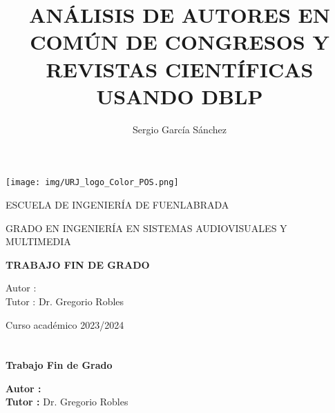 \documentclass[a4paper, 12pt]{book}
\title{ANÁLISIS DE AUTORES EN COMÚN DE CONGRESOS Y REVISTAS CIENTÍFICAS USANDO DBLP}
\author{Sergio García Sánchez}
\makeatletter
\let\thetitle\@title
\let\theauthor\@author
\makeatother
\begin{document}
\renewcommand{\refname}{Bibliografía}  %
\renewcommand{\appendixname}{Apéndice}



\begin{titlepage}
\begin{center}
\texttt{[image: img/URJ\_logo\_Color\_POS.png]}

\vspace{1.75cm}

\LARGE
ESCUELA DE INGENIERÍA DE FUENLABRADA
\vspace{1cm}

\LARGE
GRADO EN INGENIERÍA EN SISTEMAS AUDIOVISUALES Y MULTIMEDIA

\vspace{1cm}
\LARGE
\textbf{TRABAJO FIN DE GRADO}

\vspace{2cm}

\Large
\MakeUppercase{\thetitle}

\vspace{2cm}

\large
Autor : \theauthor \\
Tutor : Dr. Gregorio Robles\\

\vspace{1cm}

\large
Curso académico 2023/2024

\end{center}
\end{titlepage}

\newpage
\mbox{}
\thispagestyle{empty} %



\clearpage
{}
\chapter*{}

\vspace{-4cm}
\begin{center}
\LARGE
\textbf{Trabajo Fin de Grado}

\vspace{1cm}
\large
\thetitle

\vspace{0.8cm}
\large
\textbf{Autor :} \theauthor \\
\textbf{Tutor :} Dr. Gregorio Robles

\end{center}
\end{document}
